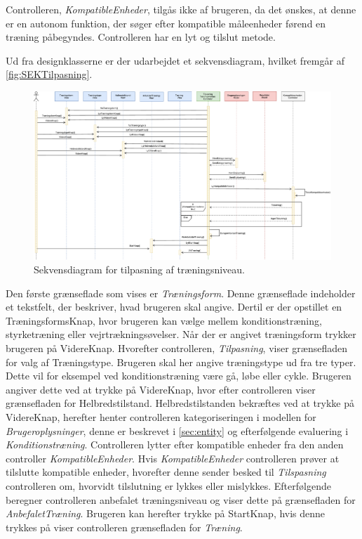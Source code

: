 \noindent 
Controlleren, \textit{KompatibleEnheder}, tilgås ikke af brugeren, da det ønskes, at denne er en autonom funktion, der søger efter kompatible måleenheder førend en træning påbegyndes. Controlleren har en lyt og tilslut metode. 

Ud fra designklasserne er der udarbejdet et sekvensdiagram, hvilket fremgår af \autoref{fig:SEKTilpasning}. 

\begin{figure} [H]
\centering
\includegraphics[width=1\textwidth]{figures/Sek/SEKTilpasning}
\caption{Sekvensdiagram for tilpasning af træningsniveau.}
\label{fig:SEKTilpasning}
\end{figure}

\noindent
Den første grænseflade som vises er \textit{Træningsform}. Denne grænseflade indeholder et tekstfelt, der beskriver, hvad brugeren skal angive. Dertil er der opstillet en TræningsformsKnap, hvor brugeren kan vælge mellem konditionstræning, styrketræning eller vejrtrækningsøvelser. Når der er angivet træningsform trykker brugeren på VidereKnap. Hvorefter controlleren, \textit{Tilpasning}, viser grænsefladen for valg af Træningstype. Brugeren skal her angive træningstype ud fra tre typer. Dette vil for eksempel ved konditionstræning være gå, løbe eller cykle. Brugeren angiver dette ved at trykke på VidereKnap, hvor efter controlleren viser grænsefladen for Helbredstilstand. Helbredstilstanden bekræftes ved at trykke på VidereKnap, herefter henter controlleren kategoriseringen i modellen for \textit{Brugeroplysninger}, denne er beskrevet i \autoref{sec:entity} og efterfølgende evaluering i \textit{Konditionstræning}. Controlleren lytter efter kompatible enheder fra den anden controller \textit{KompatibleEnheder}. Hvis \textit{KompatibleEnheder} controlleren prøver at tilslutte kompatible enheder, hvorefter denne sender besked til \textit{Tilspasning} controlleren om, hvorvidt tilslutning er lykkes eller mislykkes. Efterfølgende beregner controlleren anbefalet træningsniveau og viser dette på grænsefladen for \textit{AnbefaletTræning}. Brugeren kan herefter trykke på StartKnap, hvis denne trykkes på viser controlleren grænsefladen for \textit{Træning}. 




